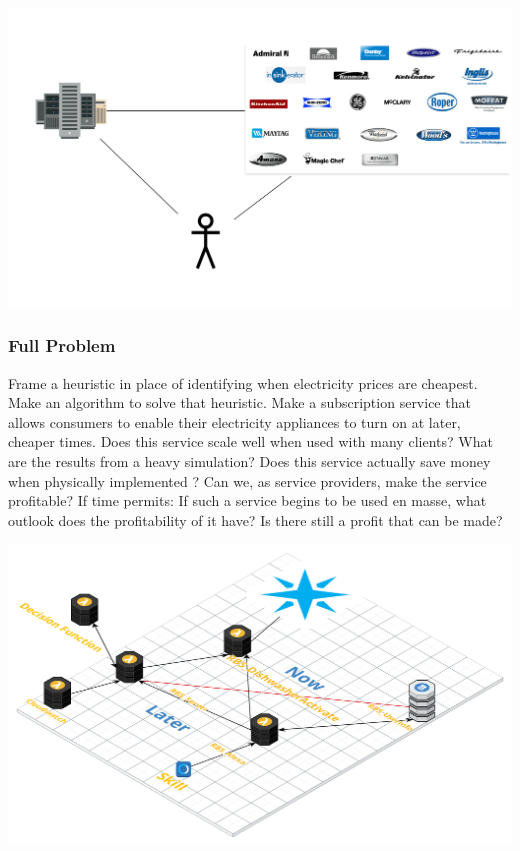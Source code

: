 \documentclass{beamer}
\begin{document}
\begin{frame}
    \includegraphics[width=0.9\paperwidth,height=0.8\paperheight,keepaspectratio]{pictures/service_model}
\end{frame}

\begin{frame}
    \frametitle{Full Problem}
    \begin{outline}
         Frame a heuristic in place of identifying when electricity prices are cheapest.
         Make an algorithm to solve that heuristic.
         Make a subscription service that allows consumers to enable their electricity
        appliances to turn on at later, cheaper times.
         Does this service scale well when used with many clients? What are the
        results from a heavy simulation?
         Does this service actually save money when physically implemented \cite{Faruqui2010}? Can we, as service providers, make the service profitable?
         If time permits: If such a service begins to be used en masse, what
        outlook does the profitability of it have? Is there still a profit that can be made?
    \end{outline}
\end{frame}

\begin{frame}
    \includegraphics[width=\paperwidth,height=\paperheight,keepaspectratio]{pictures/architecture}
\end{frame}
\end{document}

